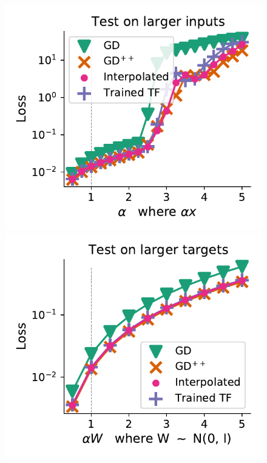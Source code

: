 \documentclass{article}
\theoremstyle{plain}
\theoremstyle{definition}
\theoremstyle{remark}
\begin{document}
\begin{figure}
\begin{center}
\begin{minipage}{.24\textwidth}
\begin{center}
  \end{center}
  \vspace{-10pt}
\end{minipage}
\begin{minipage}{.24\textwidth}
  \centering
  \begin{center}
    \includegraphics[width=1.\textwidth]{Final_figures/linear/two_layers_rec/normal_12.pdf}
  \end{center}
  \vspace{-10pt}
\end{minipage}
\begin{minipage}{.24\textwidth}
  \centering
  \begin{center}
    \includegraphics[width=1.\textwidth]{Final_figures/linear/two_layers_rec/ood_8.pdf}
  \end{center}
  \vspace{-10pt}
\end{minipage}
\end{center}


\end{figure}
\end{document}
